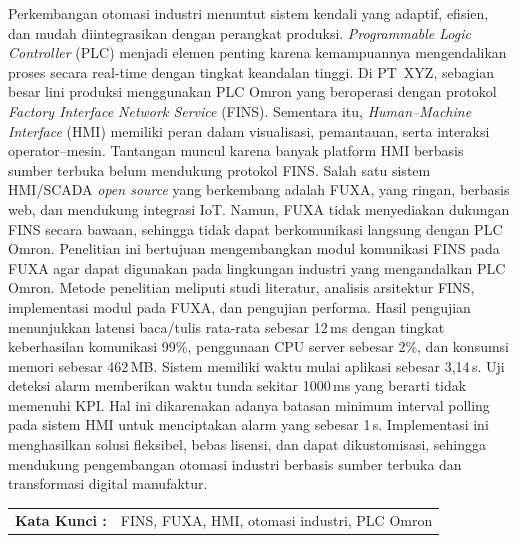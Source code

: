 Perkembangan otomasi industri menuntut sistem kendali yang adaptif, efisien, dan mudah diintegrasikan dengan perangkat produksi. \textit{Programmable Logic Controller} (PLC) menjadi elemen penting karena kemampuannya mengendalikan proses secara real-time dengan tingkat keandalan tinggi. Di PT~XYZ, sebagian besar lini produksi menggunakan PLC Omron yang beroperasi dengan protokol \textit{Factory Interface Network Service} (FINS). Sementara itu, \textit{Human–Machine Interface} (HMI) memiliki peran dalam visualisasi, pemantauan, serta interaksi operator–mesin. Tantangan muncul karena banyak platform HMI berbasis sumber terbuka belum mendukung protokol FINS. Salah satu sistem HMI/SCADA \textit{open source} yang berkembang adalah FUXA, yang ringan, berbasis web, dan mendukung integrasi IoT. Namun, FUXA tidak menyediakan dukungan FINS secara bawaan, sehingga tidak dapat berkomunikasi langsung dengan PLC Omron. Penelitian ini bertujuan mengembangkan modul komunikasi FINS pada FUXA agar dapat digunakan pada lingkungan industri yang mengandalkan PLC Omron. Metode penelitian meliputi studi literatur, analisis arsitektur FINS, implementasi modul pada FUXA, dan pengujian performa. Hasil pengujian menunjukkan latensi baca/tulis rata-rata sebesar 12\,ms dengan tingkat keberhasilan komunikasi 99\%, penggunaan CPU server sebesar 2\%, dan konsumsi memori sebesar 462\,MB. Sistem memiliki waktu mulai aplikasi sebesar 3{,}14\,s. Uji deteksi alarm memberikan waktu tunda sekitar 1000\,ms yang berarti tidak memenuhi KPI. Hal ini dikarenakan adanya batasan minimum interval polling pada sistem  HMI untuk menciptakan alarm yang sebesar 1\,s. Implementasi ini menghasilkan solusi fleksibel, bebas lisensi, dan dapat dikustomisasi, sehingga mendukung pengembangan otomasi industri berbasis sumber terbuka dan transformasi digital manufaktur.

\begin{table}[h]
    \begin{tabular}{ p{} p{} }
        \\
        \textbf{Kata Kunci :} & FINS, FUXA, HMI, otomasi industri, PLC Omron
    \end{tabular}
\end{table}

